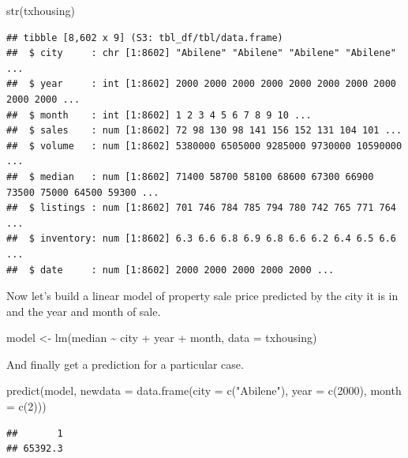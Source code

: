 \documentclass[
]{book}
\newenvironment{Shaded}{\begin{snugshade}}{\end{snugshade}}
\newcommand{\AttributeTok}[1]{\textcolor[rgb]{0.77,0.63,0.00}{#1}}
\newcommand{\DecValTok}[1]{\textcolor[rgb]{0.00,0.00,0.81}{#1}}
\newcommand{\FunctionTok}[1]{\textcolor[rgb]{0.00,0.00,0.00}{#1}}
\newcommand{\NormalTok}[1]{#1}
\newcommand{\OtherTok}[1]{\textcolor[rgb]{0.56,0.35,0.01}{#1}}
\newcommand{\SpecialCharTok}[1]{\textcolor[rgb]{0.00,0.00,0.00}{#1}}
\newcommand{\StringTok}[1]{\textcolor[rgb]{0.31,0.60,0.02}{#1}}
\begin{document}
\begin{Shaded}
\begin{Highlighting}[]
\FunctionTok{str}\NormalTok{(txhousing)}
\end{Highlighting}
\end{Shaded}

\begin{verbatim}
## tibble [8,602 x 9] (S3: tbl_df/tbl/data.frame)
##  $ city     : chr [1:8602] "Abilene" "Abilene" "Abilene" "Abilene" ...
##  $ year     : int [1:8602] 2000 2000 2000 2000 2000 2000 2000 2000 2000 2000 ...
##  $ month    : int [1:8602] 1 2 3 4 5 6 7 8 9 10 ...
##  $ sales    : num [1:8602] 72 98 130 98 141 156 152 131 104 101 ...
##  $ volume   : num [1:8602] 5380000 6505000 9285000 9730000 10590000 ...
##  $ median   : num [1:8602] 71400 58700 58100 68600 67300 66900 73500 75000 64500 59300 ...
##  $ listings : num [1:8602] 701 746 784 785 794 780 742 765 771 764 ...
##  $ inventory: num [1:8602] 6.3 6.6 6.8 6.9 6.8 6.6 6.2 6.4 6.5 6.6 ...
##  $ date     : num [1:8602] 2000 2000 2000 2000 2000 ...
\end{verbatim}

Now let's build a linear model of property sale price predicted by the city it is in and the year and month of sale.

\begin{Shaded}
\begin{Highlighting}[]
\NormalTok{model }\OtherTok{\textless{}{-}} \FunctionTok{lm}\NormalTok{(median }\SpecialCharTok{\textasciitilde{}}\NormalTok{ city }\SpecialCharTok{+}\NormalTok{ year }\SpecialCharTok{+}\NormalTok{ month, }\AttributeTok{data =}\NormalTok{ txhousing)}
\end{Highlighting}
\end{Shaded}

And finally get a prediction for a particular case.

\begin{Shaded}
\begin{Highlighting}[]
\FunctionTok{predict}\NormalTok{(model, }\AttributeTok{newdata =} \FunctionTok{data.frame}\NormalTok{(}\AttributeTok{city =} \FunctionTok{c}\NormalTok{(}\StringTok{"Abilene"}\NormalTok{), }\AttributeTok{year =} \FunctionTok{c}\NormalTok{(}\DecValTok{2000}\NormalTok{), }\AttributeTok{month =} \FunctionTok{c}\NormalTok{(}\DecValTok{2}\NormalTok{)))}
\end{Highlighting}
\end{Shaded}

\begin{verbatim}
##       1 
## 65392.3
\end{verbatim}
\end{document}
